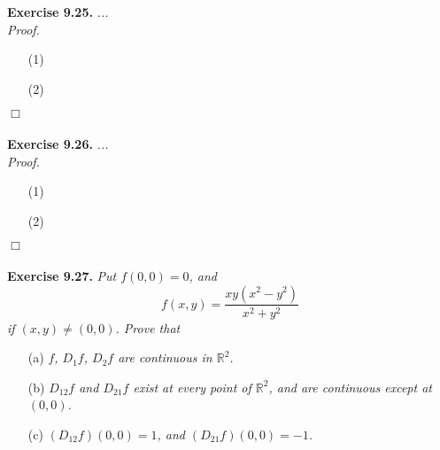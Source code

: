 \documentclass{article}
\begin{document}
\textbf{Exercise 9.25.}
\emph{...} \\

\emph{Proof.}
\begin{enumerate}
\item[(1)]
\item[(2)]

\end{enumerate}
$\Box$ \\\\






\textbf{Exercise 9.26.}
\emph{...} \\

\emph{Proof.}
\begin{enumerate}
\item[(1)]
\item[(2)]

\end{enumerate}
$\Box$ \\\\






\textbf{Exercise 9.27.}
\emph{Put $f(0,0) = 0$, and
\[
  f(x,y) = \frac{xy(x^2-y^2)}{x^2+y^2}
\]
if $(x,y) \neq (0,0)$. Prove that}
\begin{enumerate}
\item[(a)]
  \emph{$f$, $D_1 f$, $D_2 f$ are continuous in $\mathbb{R}^2$.}

\item[(b)]
  \emph{$D_{12}f$ and $D_{21}f$ exist at every point of $\mathbb{R}^2$,
  and are continuous except at $(0,0)$.}

\item[(c)]
  \emph{$(D_{12}f)(0,0) = 1$, and $(D_{21}f)(0,0) = -1$.} \\
\end{enumerate}
\end{document}
